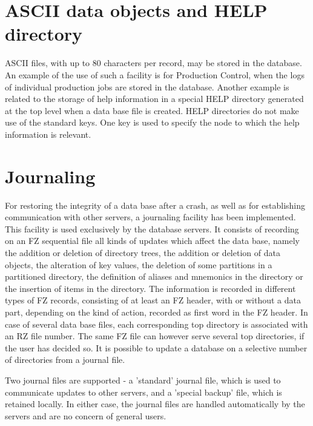 \section{ASCII data objects and HELP directory}

ASCII files, with up to 80 characters per record, may be stored in the database.
An example of the use of such a facility is for
Production Control, when the logs of individual production jobs
are stored in the database.
Another example is related to the storage of help information in a special HELP
directory generated at the top level when a data base file is created.
HELP directories do not make use of the standard keys. One key is used
to specify the node to which the help information is relevant.

\section{Journaling}

For restoring the integrity of a data base after a crash, as well as
for establishing communication with other servers, a journaling
facility has been implemented. This facility is used exclusively
by the database servers. It consists of recording on an FZ
sequential file all kinds of updates which affect the data base, namely
the addition or deletion of directory trees, the addition or deletion of
data objects, the alteration of key values, the deletion of some
partitions in a partitioned directory, the definition of aliases and
mnemonics in the  directory or the insertion of items in the
 directory. The information is recorded in different types of FZ
records, consisting of at least an FZ header, with or without a data
part, depending on the kind of action, recorded as first word in the FZ
header. In case of several data base files, each corresponding top
directory is associated with an RZ file number. The same FZ file can
however serve several top directories, if the user has decided so. It is
possible to update a database on a selective number of directories from
a journal file.

Two journal files are supported - a 'standard' journal file, which
is used to communicate updates to other servers, and a 'special
backup' file, which is retained locally. In either case, the journal
files are handled automatically by the servers and are no concern
of general users.

